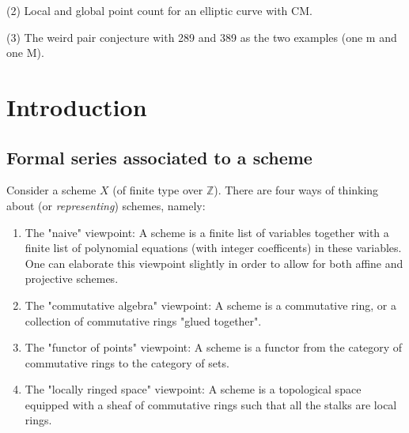 \documentclass[paper=a4, fontsize=11pt]{scrartcl} %
\numberwithin{equation}{section} %
\numberwithin{figure}{section} %
\numberwithin{table}{section} %
\begin{document}
(2) Local and global point count for an elliptic curve with CM.

(3) The weird pair conjecture with 289 and 389 as the two examples (one m and one M).


\newpage

\tableofcontents


\newpage

\section{Introduction}

\subsection{Formal series associated to a scheme}

Consider a scheme $X$ (of finite type over $\mathbb{Z}$). There are four ways of thinking about (or \emph{representing}) schemes, namely:
\begin{enumerate}
\item The "naive" viewpoint: A scheme is a finite list of variables together with a finite list of polynomial equations (with integer coefficents) in these variables. One can elaborate this viewpoint slightly in order to allow for both affine and projective schemes.
\item The "commutative algebra" viewpoint: A scheme is a commutative ring, or a collection of commutative rings "glued together".
\item The "functor of points" viewpoint: A scheme is a functor from the category of commutative rings to the category of sets.
\item The "locally ringed space" viewpoint: A scheme is a topological space equipped with a sheaf of commutative rings such that all the stalks are local rings.
\end{enumerate}
\end{document}
